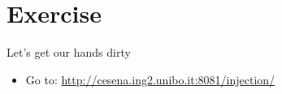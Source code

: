 \section{Exercise}

\begin{frame}{Let's get our hands dirty}
  \begin{itemize}
    \item Go to: \url{http://cesena.ing2.unibo.it:8081/injection/}
  \end{itemize}
\end{frame}
